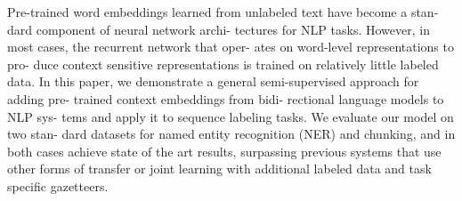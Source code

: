 Pre-trained word embeddings learned from unlabeled text have become a stan- dard component of neural network archi- tectures for NLP tasks. However, in most cases, the recurrent network that oper- ates on word-level representations to pro- duce context sensitive representations is trained on relatively little labeled data. In this paper, we demonstrate a general semi-supervised approach for adding pre- trained context embeddings from bidi- rectional language models to NLP sys- tems and apply it to sequence labeling tasks. We evaluate our model on two stan- dard datasets for named entity recognition (NER) and chunking, and in both cases achieve state of the art results, surpassing previous systems that use other forms of transfer or joint learning with additional labeled data and task specific gazetteers.
